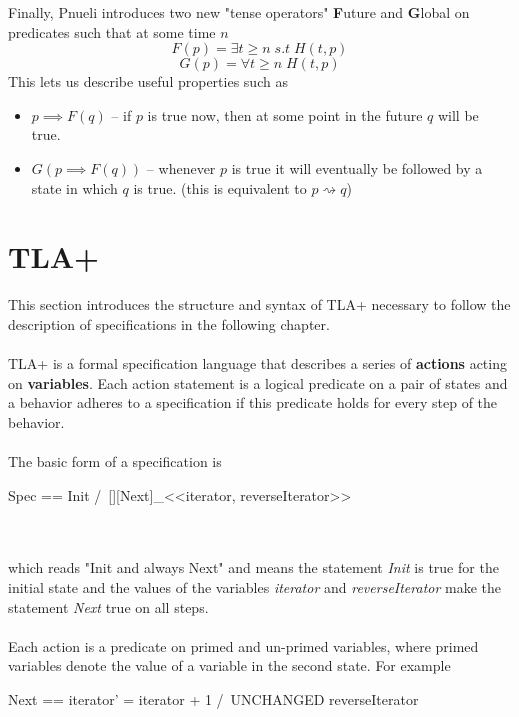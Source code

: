 \documentclass{uit-thesis}
\newcommand{\eventually}{\rightsquigarrow}
\begin{document}
Finally, Pnueli introduces two new "tense operators" \textbf{F}uture and \textbf{G}lobal on predicates such that at some time $n$
$$F(p) = \exists t \geq n \; s.t\; H(t,p)$$
$$G(p) = \forall t \geq n \; H(t,p)$$
This lets us describe useful properties such as
\begin{itemize}[label={}]
    \item $p \implies F(q)$ -- if $p$ is true now, then at some point in the future $q$ will be true.
    \item $G(p \implies F(q))$ -- whenever $p$ is true it will eventually be followed by a state in which $q$ is true. (this is equivalent to $p \eventually q$)     
\end{itemize}
\section{TLA+}\label{sec:TLA+}
This section introduces the structure and syntax of TLA+ necessary to follow the description of specifications in the following chapter.
\\\\
TLA+ is a formal specification language that describes a series of \textbf{actions} acting on \textbf{variables}. Each action statement is a logical predicate on a pair of states and a behavior adheres to a specification if this predicate holds for every step of the behavior.
\\\\
The basic form of a specification is
\begin{tla}
    Spec == Init /\ [][Next]_<<iterator, reverseIterator>>
\end{tla}
\begin{tlatex}
\end{tlatex}
\\\\
which reads "Init and always Next" and means the statement \textit{Init} is true for the initial state and the values of the variables \textit{iterator} and \textit{reverseIterator} make the statement \textit{Next} true on all steps.
\\\\
Each action is a predicate on primed and un-primed variables, where primed variables denote the value of a variable in the second state. For example
\begin{tla}
    Next == iterator' = iterator + 1 /\ UNCHANGED reverseIterator
\end{tla}
\end{document}
